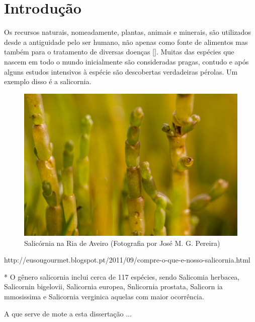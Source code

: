 \chapter{Introdução}


Os recursos naturais, nomeadamente, plantas, animais e minerais, são utilizados desde a antiguidade pelo ser humano, não apenas como fonte de alimentos mas também para o tratamento de diversas doenças []. Muitas das espécies que nascem em todo o mundo inicialmente são consideradas pragas, contudo e após alguns estudos intensivos à espécie são descobertas verdadeiras pérolas. Um exemplo disso é a salicornia.



\begin{figure}[!htb]
\centering
\includegraphics[scale= 0.3]{img/cap2-sali/Salicornia05.JPG}
\caption{Salicórnia na Ria de Aveiro (Fotografia por José M. G. Pereira)}
\label{Rotulo}
\end{figure}







http://eusougourmet.blogspot.pt/2011/09/compre-o-que-e-nosso-salicornia.html






* O gênero salicornia inclui cerca de 117 espécies, sendo Salicomia herbacea, Salicornin bigelovii, Salicornia europea, Snlicornia prostata, Salicorn ia mmosissima e Salicornia verginica aquelas com maior ocorrência. %

A que serve de mote a esta dissertação ...





